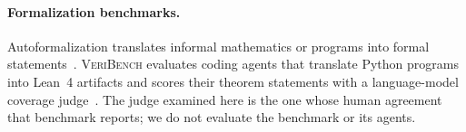 \paragraph{Formalization benchmarks.}
Autoformalization translates informal mathematics or programs into formal statements~\citep{wu2022autoformalization}.
\textsc{VeriBench} evaluates coding agents that translate Python programs into Lean~4 artifacts and scores their theorem statements with a language-model coverage judge~\citep{veribench2026}.
The judge examined here is the one whose human agreement that benchmark reports; we do not evaluate the benchmark or its agents.
